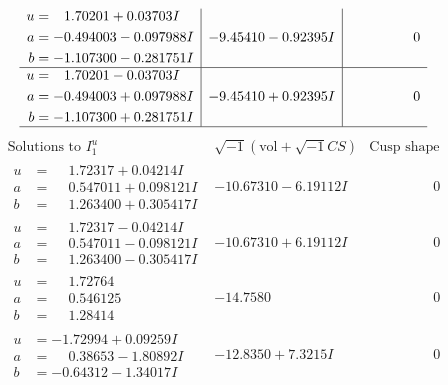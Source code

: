 \documentclass[1p]{elsarticle_modified}
\theoremstyle{definition}
\newcommand{\I}{\sqrt{-1}}
\begin{document}
$$\begin{array}{c|c|c}
\begin{aligned}
u &= \phantom{-}1.70201 + 0.03703 I \\
a &= -0.494003 - 0.097988 I \\
b &= -1.107300 - 0.281751 I\end{aligned}
 & -9.45410 - 0.92395 I & \phantom{-0.000000 } 0 \\ \hline\begin{aligned}
u &= \phantom{-}1.70201 - 0.03703 I \\
a &= -0.494003 + 0.097988 I \\
b &= -1.107300 + 0.281751 I\end{aligned}
 & -9.45410 + 0.92395 I & \phantom{-0.000000 } 0\\
 \hline 
 \end{array}$$\newpage$$\begin{array}{c|c|c}  
\text{Solutions to }I^u_{1}& \I (\text{vol} + \sqrt{-1}CS) & \text{Cusp shape}\\
 \hline 
\begin{aligned}
u &= \phantom{-}1.72317 + 0.04214 I \\
a &= \phantom{-}0.547011 + 0.098121 I \\
b &= \phantom{-}1.263400 + 0.305417 I\end{aligned}
 & -10.67310 - 6.19112 I & \phantom{-0.000000 } 0 \\ \hline\begin{aligned}
u &= \phantom{-}1.72317 - 0.04214 I \\
a &= \phantom{-}0.547011 - 0.098121 I \\
b &= \phantom{-}1.263400 - 0.305417 I\end{aligned}
 & -10.67310 + 6.19112 I & \phantom{-0.000000 } 0 \\ \hline\begin{aligned}
u &= \phantom{-}1.72764\phantom{ +0.000000I} \\
a &= \phantom{-}0.546125\phantom{ +0.000000I} \\
b &= \phantom{-}1.28414\phantom{ +0.000000I}\end{aligned}
 & -14.7580\phantom{ +0.000000I} & \phantom{-0.000000 } 0 \\ \hline\begin{aligned}
u &= -1.72994 + 0.09259 I \\
a &= \phantom{-}0.38653 - 1.80892 I \\
b &= -0.64312 - 1.34017 I\end{aligned}
 & -12.8350 + 7.3215 I & \phantom{-0.000000 } 0 \\ \hline\begin{aligned}

\end{aligned}
\end{array}$$
\end{document}
